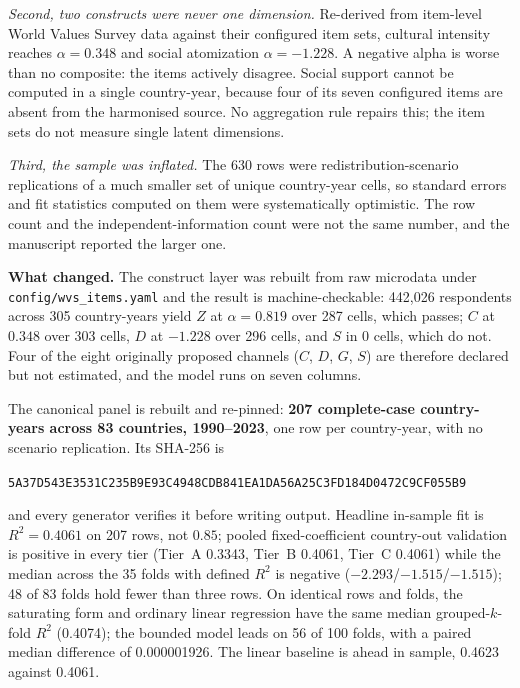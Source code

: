 \documentclass[11pt]{article}
\begin{document}
\emph{Second, two constructs were never one dimension.} Re-derived from item-level World Values Survey data against their configured item sets, cultural intensity reaches $\alpha = 0.348$ and social atomization $\alpha = -1.228$. A negative alpha is worse than no composite: the items actively disagree. Social support cannot be computed in a single country-year, because four of its seven configured items are absent from the harmonised source. No aggregation rule repairs this; the item sets do not measure single latent dimensions.

\emph{Third, the sample was inflated.} The 630 rows were redistribution-scenario replications of a much smaller set of unique country-year cells, so standard errors and fit statistics computed on them were systematically optimistic. The row count and the independent-information count were not the same number, and the manuscript reported the larger one.

\noindent\justifying
\textbf{What changed.} The construct layer was rebuilt from raw microdata under \texttt{config/wvs\_items.yaml} and the result is machine-checkable: 442{,}026 respondents across 305 country-years yield $Z$ at $\alpha = 0.819$ over 287 cells, which passes; $C$ at $0.348$ over 303 cells, $D$ at $-1.228$ over 296 cells, and $S$ in 0 cells, which do not. Four of the eight originally proposed channels ($C$, $D$, $G$, $S$) are therefore declared but not estimated, and the model runs on seven columns.

The canonical panel is rebuilt and re-pinned: \textbf{207 complete-case country-years across 83 countries, 1990--2023}, one row per country-year, with no scenario replication. Its SHA-256 is
\begin{center}
\texttt{5A37D543E3531C235B9E93C4948CDB841EA1DA56A25C3FD184D0472C9CF055B9}
\end{center}
and every generator verifies it before writing output. Headline in-sample fit is $R^2 = 0.4061$ on 207 rows, not $0.85$; pooled fixed-coefficient country-out validation is positive in every tier (Tier~A \num{0.3343}, Tier~B \num{0.4061}, Tier~C \num{0.4061}) while the median across the 35 folds with defined $R^2$ is negative ($-2.293$/$-1.515$/$-1.515$); 48 of 83 folds hold fewer than three rows. On identical rows and folds, the saturating form and ordinary linear regression have the same median grouped-$k$-fold $R^2$ (\num{0.4074}); the bounded model leads on 56 of 100 folds, with a paired median difference of \num{0.000001926}. The linear baseline is ahead in sample, \num{0.4623} against \num{0.4061}.
\end{document}
